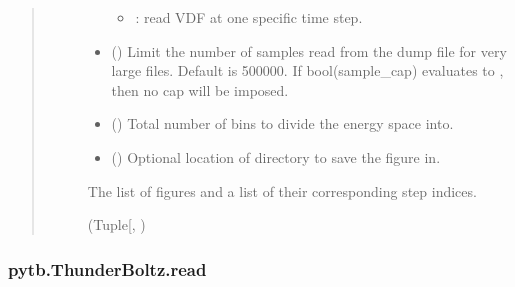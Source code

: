 \documentclass[letterpaper,10pt,english,openany,oneside]{sphinxmanual}
\begin{document}
\begin{fulllineitems}
\begin{fulllineitems}
\begin{quote}
\begin{description}
\begin{itemize}
\begin{itemize}
\item {} 
\sphinxAtStartPar
{}: read VDF at one specific time step.

\end{itemize}


\item {} 
\sphinxAtStartPar
{} () \textendash{} Limit the number of samples read from the dump
file for very large files. Default is 500000. If bool(sample\_cap)
evaluates to , then no cap will be imposed.

\item {} 
\sphinxAtStartPar
{} () \textendash{} Total number of bins to divide the energy space into.

\item {} 
\sphinxAtStartPar
{} () \textendash{} Optional location of directory to save the figure in.

\end{itemize}

\sphinxAtStartPar
The list of
figures and a list of their corresponding step indices.

\sphinxAtStartPar
(Tuple{[}\sphinxhref{https://docs.python.org/3/library/stdtypes.html\#list}{list}{[}\sphinxhref{https://matplotlib.org/stable/api/figure\_api.html\#matplotlib.figure.Figure}{matplotlib.figure.Figure}{]}, \sphinxhref{https://docs.python.org/3/library/stdtypes.html\#list}{list}{[}\sphinxhref{https://docs.python.org/3/library/functions.html\#int}{int}{]})

\end{description}\end{quote}

\end{fulllineitems}


\sphinxstepscope


\subsubsection{pytb.ThunderBoltz.read}
\label{\detokenize{api/pytb.ThunderBoltz.read:pytb-thunderboltz-read}}\label{\detokenize{api/pytb.ThunderBoltz.read::doc}}


\end{fulllineitems}
\end{document}
